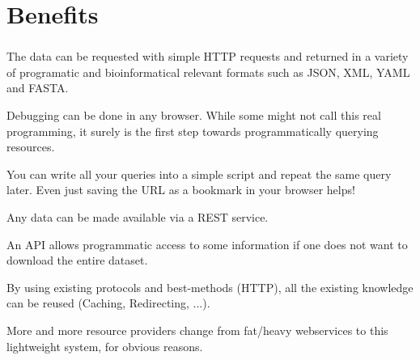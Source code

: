 \documentclass[a4paper,10pt,xcolor=pdftex,dvipsnames,table]{beamer}
\begin{document}
\section{Benefits}
\begin{frame}[t]\frametitle{\insertsection{}}
  \begin{description}[<+->]
   \item[Easy requests] The data can be requested with simple HTTP requests and returned in a variety of programatic and bioinformatical relevant formats such as JSON, XML, YAML and FASTA. 
   \item[Easy debugging] Debugging can be done in any browser. While some might not call this real programming, it surely is the first step towards programmatically querying resources.
   \item[Reproducable] You can write all your queries into a simple script and repeat the same query later. Even just saving the URL as a bookmark in your browser helps!
   \item[Powerful] Any data can be made available via a REST service.
   \item[Bandwidth] An API allows programmatic access to some information if one does not want to download the entire dataset.
   \item[Standards] By using existing protocols and best-methods (HTTP), all the existing knowledge can be reused (Caching, Redirecting, ...).
   \item[Widespread] More and more resource providers change from fat/heavy webservices to this lightweight system, for obvious reasons.
  \end{description}
  \vspace{-2mm}%
\end{frame}
\end{document}
